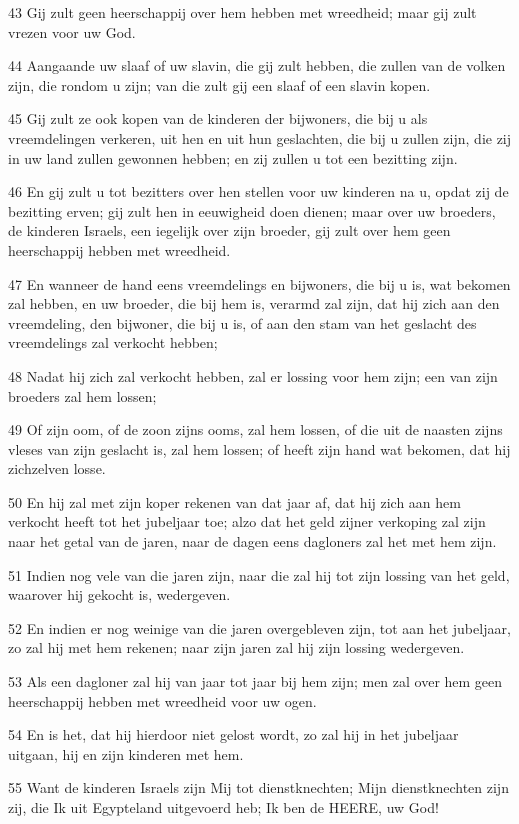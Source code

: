 \par 43 Gij zult geen heerschappij over hem hebben met wreedheid; maar gij zult vrezen voor uw God.
\par 44 Aangaande uw slaaf of uw slavin, die gij zult hebben, die zullen van de volken zijn, die rondom u zijn; van die zult gij een slaaf of een slavin kopen.
\par 45 Gij zult ze ook kopen van de kinderen der bijwoners, die bij u als vreemdelingen verkeren, uit hen en uit hun geslachten, die bij u zullen zijn, die zij in uw land zullen gewonnen hebben; en zij zullen u tot een bezitting zijn.
\par 46 En gij zult u tot bezitters over hen stellen voor uw kinderen na u, opdat zij de bezitting erven; gij zult hen in eeuwigheid doen dienen; maar over uw broeders, de kinderen Israels, een iegelijk over zijn broeder, gij zult over hem geen heerschappij hebben met wreedheid.
\par 47 En wanneer de hand eens vreemdelings en bijwoners, die bij u is, wat bekomen zal hebben, en uw broeder, die bij hem is, verarmd zal zijn, dat hij zich aan den vreemdeling, den bijwoner, die bij u is, of aan den stam van het geslacht des vreemdelings zal verkocht hebben;
\par 48 Nadat hij zich zal verkocht hebben, zal er lossing voor hem zijn; een van zijn broeders zal hem lossen;
\par 49 Of zijn oom, of de zoon zijns ooms, zal hem lossen, of die uit de naasten zijns vleses van zijn geslacht is, zal hem lossen; of heeft zijn hand wat bekomen, dat hij zichzelven losse.
\par 50 En hij zal met zijn koper rekenen van dat jaar af, dat hij zich aan hem verkocht heeft tot het jubeljaar toe; alzo dat het geld zijner verkoping zal zijn naar het getal van de jaren, naar de dagen eens dagloners zal het met hem zijn.
\par 51 Indien nog vele van die jaren zijn, naar die zal hij tot zijn lossing van het geld, waarover hij gekocht is, wedergeven.
\par 52 En indien er nog weinige van die jaren overgebleven zijn, tot aan het jubeljaar, zo zal hij met hem rekenen; naar zijn jaren zal hij zijn lossing wedergeven.
\par 53 Als een dagloner zal hij van jaar tot jaar bij hem zijn; men zal over hem geen heerschappij hebben met wreedheid voor uw ogen.
\par 54 En is het, dat hij hierdoor niet gelost wordt, zo zal hij in het jubeljaar uitgaan, hij en zijn kinderen met hem.
\par 55 Want de kinderen Israels zijn Mij tot dienstknechten; Mijn dienstknechten zijn zij, die Ik uit Egypteland uitgevoerd heb; Ik ben de HEERE, uw God!


